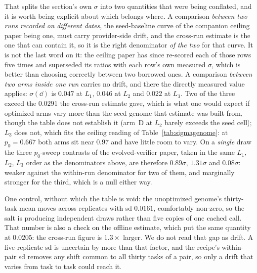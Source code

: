 \documentclass[11pt]{article}
\begin{document}
That splits the section's own $\sigma$ into two quantities that were being conflated, and it is
worth being explicit about which belongs where. A comparison \emph{between two runs recorded on
different dates}, the seed-baseline curve of the companion ceiling paper being one, must carry
provider-side drift, and the cross-run estimate is the one that can contain it, so it is the right
denominator \emph{of the two} for that curve. It is not the last word on it: the ceiling paper has
since re-scored each of those rows five times and superseded its ratios with each row's own measured
$\sigma$, which is better than choosing correctly between two borrowed ones. A comparison \emph{between two arms
inside one run} carries no drift, and there the directly measured value applies: $\sigma(\dd)$
is $0.047$ at $L_1$, $0.046$ at $L_2$ and $0.022$ at $L_3$. Two of the three exceed the
$0.0291$ the cross-run estimate gave, which is what one would expect if optimized arms vary more
than the seed genome that estimate was built from, though the table does not establish it (arm~D
at $L_2$ barely exceeds the seed cell); $L_3$ does not, which fits the ceiling reading of
Table~\ref{tab:sigmagenome}: at $p_0 = 0.667$ both arms sit near $0.97$ and
have little room to vary.
On a \emph{single} draw the three $p_0$-sweep contrasts of the evolved-verifier paper,
taken in the same $L_1$, $L_2$, $L_3$ order as the denominators above, are therefore $0.89\sigma$,
$1.31\sigma$ and $0.08\sigma$: weaker against the within-run denominator for two of them,
and marginally stronger for the third, which is a null either way.

One control, without which the table is void: the unoptimized genome's thirty-task mean moves
across replicates with sd $0.0161$, comfortably non-zero, so the salt is producing independent
draws rather than five copies of one cached call. That number is also a check on the offline
estimate, which put the same quantity at $0.0205$: the cross-run figure is $1.3\times$ larger.
We do not read that gap as drift. A five-replicate sd is uncertain by more than that factor, and
the recipe's within-pair sd removes any shift common to all thirty tasks of a pair, so only a
drift that varies from task to task could reach it.
\end{document}
